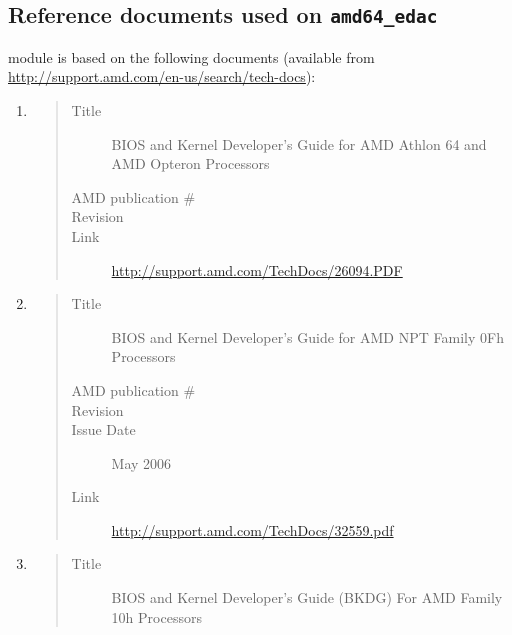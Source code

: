 \documentclass[a4paper,8pt,english]{sphinxmanual}
\begin{document}
\subsection{Reference documents used on \texttt{amd64\_edac}}
\label{admin-guide/ras:reference-documents-used-on-amd64-edac}
 module is based on the following documents
(available from \href{http://support.amd.com/en-us/search/tech-docs}{http://support.amd.com/en-us/search/tech-docs}):
\begin{enumerate}
\item {} \begin{quote}\begin{description}
\item[{Title}] \leavevmode
BIOS and Kernel Developer's Guide for AMD Athlon 64 and AMD
Opteron Processors

\item[{AMD publication \#}] 

\item[{Revision}] 

\item[{Link}] \leavevmode
\href{http://support.amd.com/TechDocs/26094.PDF}{http://support.amd.com/TechDocs/26094.PDF}

\end{description}\end{quote}

\item {} \begin{quote}\begin{description}
\item[{Title}] \leavevmode
BIOS and Kernel Developer's Guide for AMD NPT Family 0Fh
Processors

\item[{AMD publication \#}] 

\item[{Revision}] 

\item[{Issue Date}] \leavevmode
May 2006

\item[{Link}] \leavevmode
\href{http://support.amd.com/TechDocs/32559.pdf}{http://support.amd.com/TechDocs/32559.pdf}

\end{description}\end{quote}

\item {} \begin{quote}\begin{description}
\item[{Title}] \leavevmode
BIOS and Kernel Developer's Guide (BKDG) For AMD Family 10h
Processors


\end{description}
\end{quote}
\end{enumerate}
\end{document}

